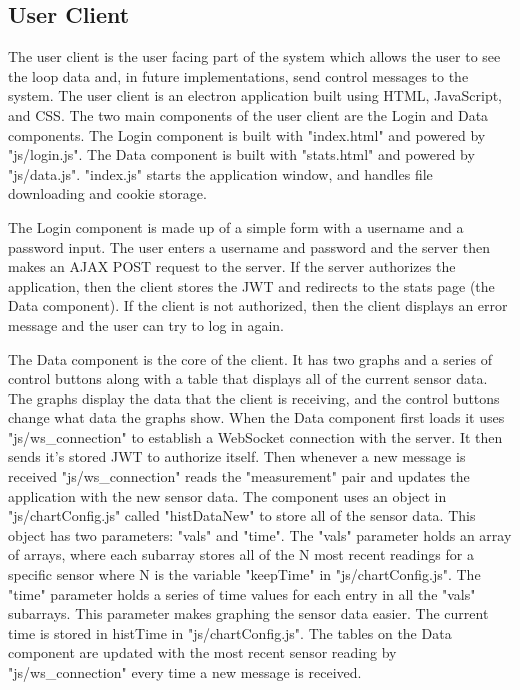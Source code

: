 \documentclass[10pt,technote]{IEEEtran}
\begin{document}
\subsection{User Client}
The user client is the user facing part of the system which allows the user to see the loop data and, in future implementations, send control messages to the system. The user client is an electron application built using HTML, JavaScript, and CSS. The two main components of the user client are the Login and Data components. The Login component is built with "index.html" and powered by "js/login.js". The Data component is built with "stats.html" and powered by "js/data.js". "index.js" starts the application window, and handles file downloading and cookie storage.
\par
The Login component is made up of a simple form with a username and a password input. The user enters a username and password and the server then makes an AJAX POST request to the server. If the server authorizes the application, then the client stores the JWT and redirects to the stats page (the Data component). If the client is not authorized, then the client displays an error message and the user can try to log in again.
\par
The Data component is the core of the client. It has two graphs and a series of control buttons along with a table that displays all of the current sensor data. The graphs display the data that the client is receiving, and the control buttons change what data the graphs show. When the Data component first loads it uses "js/ws\_connection" to establish a WebSocket connection with the server. It then sends it's stored JWT to authorize itself. Then whenever a new message is received "js/ws\_connection" reads the "measurement" pair and updates the application with the new sensor data. The component uses an object in "js/chartConfig.js" called "histDataNew" to store all of the sensor data. This object has two parameters: "vals" and "time". The "vals" parameter holds an array of arrays, where each subarray stores all of the N most recent readings for a specific sensor where N is the variable "keepTime" in "js/chartConfig.js". The "time" parameter holds a series of time values for each entry in all the "vals" subarrays. This parameter makes graphing the sensor data easier. The current time is stored in histTime in "js/chartConfig.js". The tables on the Data component are updated with the most recent sensor reading by "js/ws\_connection" every time a new message is received. 
\end{document}
